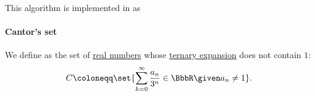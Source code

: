 \begin{comments}
  \item This algorithm is implemented in \cite{notebook:code} as
  \begin{CodeRefDisplay}
  \end{CodeRefDisplay}
\end{comments}

\paragraph{Cantor's set}

\begin{definition}\label{def:cantors_set}
  We define  as the set of \hyperref[def:real_numbers]{real numbers} whose \hyperref[def:positional_number_system/ternary]{ternary expansion} does not contain \( 1 \):
  \begin{equation*}
    C \coloneqq \set{ \sum_{k=0}^\infty \frac {a_n} {3^n} \in \BbbR \given a_n \neq 1 }.
  \end{equation*}
\end{definition}
